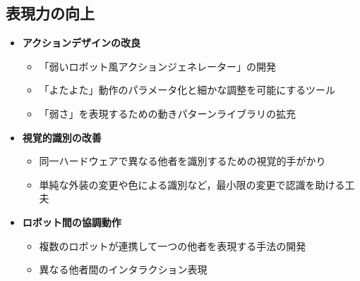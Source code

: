 \documentclass{cuxarticle}
\begin{document}
\subsection{表現力の向上}
\begin{itemize}
  \item \textbf{アクションデザインの改良}
    \begin{itemize}
      \item 「弱いロボット風アクションジェネレーター」の開発
      \item 「よたよた」動作のパラメータ化と細かな調整を可能にするツール
      \item 「弱さ」を表現するための動きパターンライブラリの拡充
    \end{itemize}

  \item \textbf{視覚的識別の改善}
    \begin{itemize}
      \item 同一ハードウェアで異なる他者を識別するための視覚的手がかり
      \item 単純な外装の変更や色による識別など，最小限の変更で認識を助ける工夫
    \end{itemize}

  \item \textbf{ロボット間の協調動作}
    \begin{itemize}
      \item 複数のロボットが連携して一つの他者を表現する手法の開発
      \item 異なる他者間のインタラクション表現
    \end{itemize}
\end{itemize}
\end{document}
